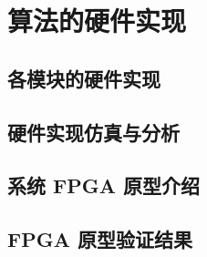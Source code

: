 \chapter{算法的硬件实现}
\label{cha:c4}

\section{各模块的硬件实现}

\section{硬件实现仿真与分析}

\section{系统 FPGA 原型介绍}

\section{FPGA 原型验证结果}